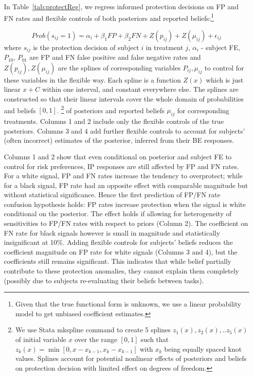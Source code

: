 \documentclass[12pt,a4paper]{article}
\begin{document}






In Table~\ref{tab:protectReg}, we regress informed protection decisions on FP and FN rates and flexible controls of both posteriors and reported beliefs:\footnote{ Given that the true functional form is unknown, we use a linear probability model to get unbiased coefficient estimates.}

	\[Prob(s_{ij}=1)=\alpha_i+\beta_1 FP +\beta_2 FN +Z(p_{ij})+Z(\mu_{ij})+\epsilon_{ij} \]
where $s_{ij}$ is the protection decision of subject $i$ in treatment $j$, $\alpha_i$ - subject FE, $P_{10}$, $P_{01}$ are FP and FN false positive and false negative rates and $Z(p_{ij}),Z(\mu_{ij})$ are the splines of corresponding variables $P_{ij}, \mu_{ij}$ to control for these variables in the flexible way. Each spline is a function $Z(x)$ which is just linear $x+C$ within one interval, and constant everywhere else. The splines are constructed so that their linear intervals cover the whole domain of probabilities and beliefs $[0,1]$.  \footnote{We use Stata mkspline command to create 5 splines $z_1(x),z_2(x),..z_5(x)$ of initial variable $x$ over the range $[0,1]$ such that $z_k(x)=\min[0,x-x_{k-1},x_k-x_{k-1}]$ with $x_k$ being equally spaced knot values. Splines account for potential nonlinear effects of posteriors and beliefs on protection decision with limited effect on degrees of freedom.} of posteriors and reported beliefs $\mu_{ij}$ for corresponding treatments. Columns 1 and 2 include only the flexible controls of the true posteriors. Columns 3 and 4 add further flexible controls to account for subjects' (often incorrect) estimates of the posterior, inferred from their BE responses.

Columns 1 and 2 show that even conditional on posterior and subject FE to control for risk preferences, IP responses are still affected by FP and FN rates. For a white signal, FP and FN rates increase the tendency to overprotect; while for a black signal, FP rate had an opposite effect with comparable magnitude but without statistical significance. Hence the first prediction of FP/FN rate confusion hypothesis holds: FP rates increase protection when the signal is white conditional on the posterior. The effect holds if allowing for heterogeneity of sensitivities to FP/FN rates with respect to priors (Column 2). The coefficient on FN rate for black signals however is small in magnitude and statistically insignificant at 10\%. Adding flexible controls for subjects' beliefs reduces the coefficient magnitude on FP rate for white signals (Columns 3 and 4), but the coefficients still remains significant. This indicates that while belief partially contribute to these protection anomalies, they cannot explain them completely (possibly due to subjects re-evaluating their beliefs between tasks). 
\end{document}
